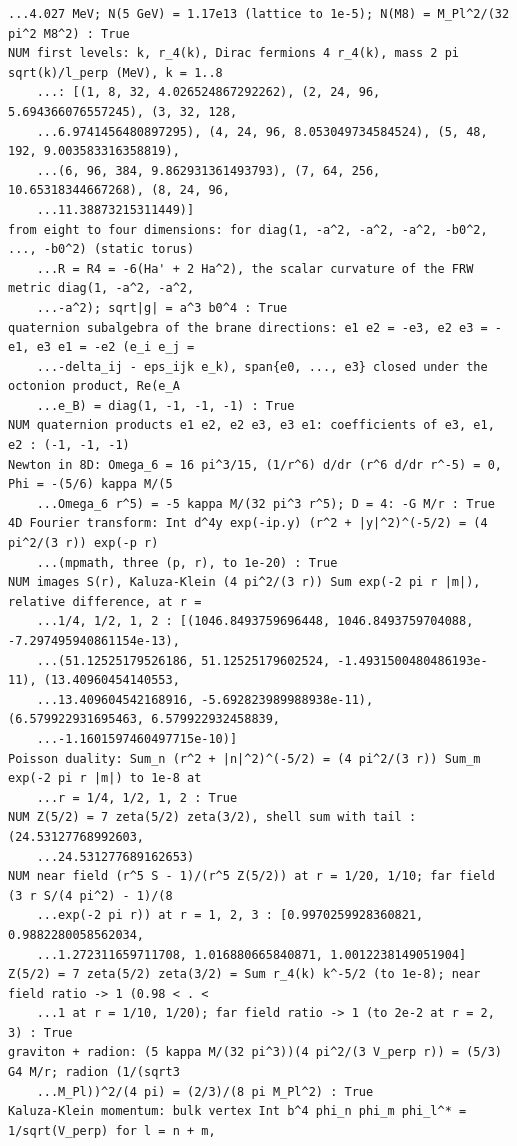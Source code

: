 \documentclass[10pt,a4paper]{article}
\begin{document}
\begin{Verbatim}[fontsize=\small,frame=single,framesep=2mm]
    ...4.027 MeV; N(5 GeV) = 1.17e13 (lattice to 1e-5); N(M8) = M_Pl^2/(32 pi^2 M8^2) : True
NUM first levels: k, r_4(k), Dirac fermions 4 r_4(k), mass 2 pi sqrt(k)/l_perp (MeV), k = 1..8
    ...: [(1, 8, 32, 4.026524867292262), (2, 24, 96, 5.694366076557245), (3, 32, 128,
    ...6.9741456480897295), (4, 24, 96, 8.053049734584524), (5, 48, 192, 9.003583316358819),
    ...(6, 96, 384, 9.862931361493793), (7, 64, 256, 10.65318344667268), (8, 24, 96,
    ...11.38873215311449)]
from eight to four dimensions: for diag(1, -a^2, -a^2, -a^2, -b0^2, ..., -b0^2) (static torus)
    ...R = R4 = -6(Ha' + 2 Ha^2), the scalar curvature of the FRW metric diag(1, -a^2, -a^2,
    ...-a^2); sqrt|g| = a^3 b0^4 : True
quaternion subalgebra of the brane directions: e1 e2 = -e3, e2 e3 = -e1, e3 e1 = -e2 (e_i e_j =
    ...-delta_ij - eps_ijk e_k), span{e0, ..., e3} closed under the octonion product, Re(e_A
    ...e_B) = diag(1, -1, -1, -1) : True
NUM quaternion products e1 e2, e2 e3, e3 e1: coefficients of e3, e1, e2 : (-1, -1, -1)
Newton in 8D: Omega_6 = 16 pi^3/15, (1/r^6) d/dr (r^6 d/dr r^-5) = 0, Phi = -(5/6) kappa M/(5
    ...Omega_6 r^5) = -5 kappa M/(32 pi^3 r^5); D = 4: -G M/r : True
4D Fourier transform: Int d^4y exp(-ip.y) (r^2 + |y|^2)^(-5/2) = (4 pi^2/(3 r)) exp(-p r)
    ...(mpmath, three (p, r), to 1e-20) : True
NUM images S(r), Kaluza-Klein (4 pi^2/(3 r)) Sum exp(-2 pi r |m|), relative difference, at r =
    ...1/4, 1/2, 1, 2 : [(1046.8493759696448, 1046.8493759704088, -7.297495940861154e-13),
    ...(51.12525179526186, 51.12525179602524, -1.4931500480486193e-11), (13.40960454140553,
    ...13.409604542168916, -5.692823989988938e-11), (6.579922931695463, 6.579922932458839,
    ...-1.1601597460497715e-10)]
Poisson duality: Sum_n (r^2 + |n|^2)^(-5/2) = (4 pi^2/(3 r)) Sum_m exp(-2 pi r |m|) to 1e-8 at
    ...r = 1/4, 1/2, 1, 2 : True
NUM Z(5/2) = 7 zeta(5/2) zeta(3/2), shell sum with tail : (24.53127768992603,
    ...24.531277689162653)
NUM near field (r^5 S - 1)/(r^5 Z(5/2)) at r = 1/20, 1/10; far field (3 r S/(4 pi^2) - 1)/(8
    ...exp(-2 pi r)) at r = 1, 2, 3 : [0.9970259928360821, 0.9882280058562034,
    ...1.272311659711708, 1.016880665840871, 1.0012238149051904]
Z(5/2) = 7 zeta(5/2) zeta(3/2) = Sum r_4(k) k^-5/2 (to 1e-8); near field ratio -> 1 (0.98 < . <
    ...1 at r = 1/10, 1/20); far field ratio -> 1 (to 2e-2 at r = 2, 3) : True
graviton + radion: (5 kappa M/(32 pi^3))(4 pi^2/(3 V_perp r)) = (5/3) G4 M/r; radion (1/(sqrt3
    ...M_Pl))^2/(4 pi) = (2/3)/(8 pi M_Pl^2) : True
Kaluza-Klein momentum: bulk vertex Int b^4 phi_n phi_m phi_l^* = 1/sqrt(V_perp) for l = n + m,

\end{Verbatim}
\end{document}
